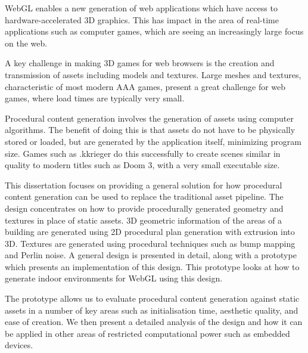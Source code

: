 WebGL enables a new generation of web applications which have access to hardware-accelerated 3D graphics.
This has impact in the area of real-time applications such as computer games, which are seeing an increasingly large focus on the web.

A key challenge in making 3D games for web browsers is the creation and transmission of assets including models and textures.
Large meshes and textures, characteristic of most modern AAA games, present a great challenge for web games, where load times are typically very small.

Procedural content generation involves the generation of assets using computer algorithms.
The benefit of doing this is that assets do not have to be physically stored or loaded, but are generated by the application itself, minimizing program size.
Games such as .kkrieger do this successfully to create scenes similar in quality to modern titles such as Doom 3, with a very small executable size.

This dissertation focuses on providing a general solution for how procedural content generation can be used to replace the traditional asset pipeline.
The design concentrates on how to provide procedurally generated geometry and textures in place of static assets.
3D geometric information of the areas of a building are generated using 2D procedural plan generation with extrusion into 3D.
Textures are generated using procedural techniques such as bump mapping and Perlin noise.
A general design is presented in detail, along with a prototype which presents an implementation of this design.
This prototype looks at how to generate indoor environments for WebGL using this design.

The prototype allows us to evaluate procedural content generation against static assets in a number of key areas such as initialisation time, aesthetic quality, and ease of creation.
We then present a detailed analysis of the design and how it can be applied in other areas of restricted computational power such as embedded devices.
